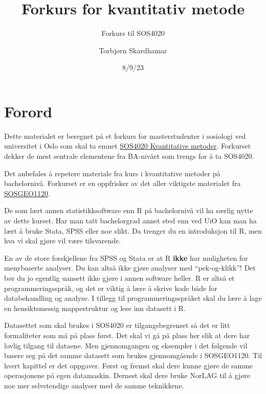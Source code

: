 \documentclass[
  letterpaper,
  DIV=11,
  numbers=noendperiod]{scrreprt}
\title{Forkurs for kvantitativ metode}
\subtitle{Forkurs til SOS4020}
\author{Torbjørn Skardhamar}
\date{8/9/23}
\renewcommand*\contentsname{Table of contents}
\newcommand\contentsname{Table of contents}
\theoremstyle{definition}
\theoremstyle{remark}
\begin{document}
\maketitle
\ifdefined\Shaded\renewenvironment{Shaded}{\begin{tcolorbox}[interior hidden, borderline west={3pt}{0pt}{shadecolor}, boxrule=0pt, sharp corners, breakable, enhanced, frame hidden]}{\end{tcolorbox}}\fi

\renewcommand*\contentsname{Table of contents}
{
\hypersetup{linkcolor=}
\setcounter{tocdepth}{2}
\tableofcontents
}

\hypertarget{forord}{%
\chapter*{Forord}\label{forord}}


Dette materialet er beregnet på et forkurs for masterstudenter i
sosiologi ved universitet i Oslo som skal ta emnet
\href{https://www.uio.no/studier/emner/sv/iss/SOS4020/}{SOS4020
Kvantitative metoder}. Forkurset dekker de mest sentrale elementene fra
BA-nivået som trengs for å ta SOS4020.

Det anbefales å repetere materiale fra kurs i kvantitative metoder på
bachelornivå. Forkurset er en oppfrisker av det aller viktigste
materialet fra
\href{https://www.uio.no/studier/emner/sv/iss/SOSGEO1120/}{SOSGEO1120}.

De som lært annen statistikksoftware enn R på bachelornivå vil ha særlig
nytte av dette kurset. Har man tatt bachelorgrad annet sted enn ved UiO
kan man ha lært å bruke Stata, SPSS eller noe slikt. Da trenger du en
introduksjon til R, men hva vi skal gjøre vil være tilsvarende.

En av de store forskjellene fra SPSS og Stata er at R \textbf{ikke} har
muligheten for menybaserte analyser. Du kan altså ikke gjøre analyser
med ``pek-og-klikk''! Det bør du jo egentlig uansett ikke gjøre i annen
software heller. R er altså et programmeringsspråk, og det er viktig å
lære å skrive kode både for databehandling og analyse. I tillegg til
programmeringsspråket skal du lære å lage en hensiktsmessig
mappestruktur og lese inn datasett i R.

Datasettet som skal brukes i SOS4020 er tilgangsbegrenset så det er litt
formaliteter som må på plass først. Det skal vi gå på plass her slik at
dere har lovlig tilgang til dataene. Men gjennomgangen og eksempler i
det følgende vil basere seg på det samme datasett som brukes
gjennomgående i SOSGEO1120. Til hvert kapittel er det oppgaver. Først og
fremst skal dere kunne gjøre de samme operasjonene på egen datamaskin.
Dernest skal dere bruke NorLAG til å gjøre noe mer selvstendige analyser
med de samme teknikkene.
\end{document}
